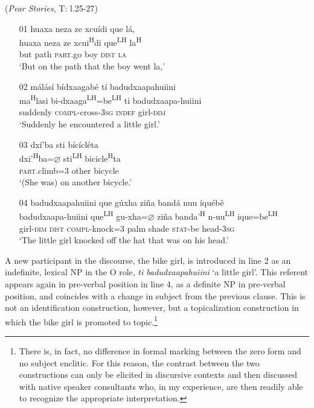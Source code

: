 \ea\label{topicalization1}  (\textit{Pear Stories}, T: l.25-27)
\begin{itemize}
\item[01]
\glll huaxa neza ze xcu\'{i}di que l\'{a},  \\
huaxa neza ze xcui\textsuperscript{H}di que\textsuperscript{LH} la\textsuperscript{H}  \\
but path \textsc{part}.go boy \textsc{dist} \textsc{la}  \\
\glt `But on the path that the boy went la,'


\item[02]
\glll m\'{a}l\'{a}s\'{i} b\'{i}dxaagab\'{e} t\'{i} badudxaapahuiini  \\
ma\textsuperscript{H}lasi bi-dxaaga\textsuperscript{LH}=be\textsuperscript{LH} ti badudxaapa-huiini  \\
suddenly \textsc{compl}-cross-3\textsc{sg} \textsc{indef} girl-\textsc{dim}  \\
\glt `Suddenly he encountered a little girl.'


\item[03]
\glll dx\'{i}'ba sti b\'{i}c\'{i}cl\'{e}ta  \\
dxi'\textsuperscript{H}ba=$\varnothing$ sti\textsuperscript{LH} bicicle\textsuperscript{H}ta  \\
\textsc{part}.climb=\textsc{3} other bicycle  \\
\glt `(She was) on another bicycle.'


\item[04]
\glll badudxaapahuiini que g\'{u}xha zi\~{n}a band\'{a} nuu \'{i}qu\'{e}b\v{e}  \\
badudxaapa-huiini que\textsuperscript{LH} gu-xha=$\varnothing$ zi\~{n}a banda'\textsuperscript{H} n-uu\textsuperscript{LH} ique=be\textsuperscript{LH}  \\
girl-\textsc{dim} \textsc{dist} \textsc{compl}-knock=\textsc{3} palm shade \textsc{stat}-be head-3\textsc{sg}  \\
\glt `The little girl knocked off the hat that was on his head.' 

\end{itemize}
\z
A new participant in the discourse, the bike girl, is introduced in line 2 as an indefinite, lexical NP in the O role, \textit{ti badudxaapahuiini} `a little girl'. This referent appears again in pre-verbal position in line 4, as a definite NP in pre-verbal position, and coincides with a change in subject from the previous clause. This is not an identification construction, however, but a topicalization construction in which the bike girl is promoted to topic.\footnote{There is, in fact, no difference in formal marking between the zero form and no subject enclitic. For this reason, the contrast between the two constructions can only be elicited in discursive contexts and then discussed with native speaker consultants who, in my experience, are then readily able to recognize the appropriate interpretation.} 

